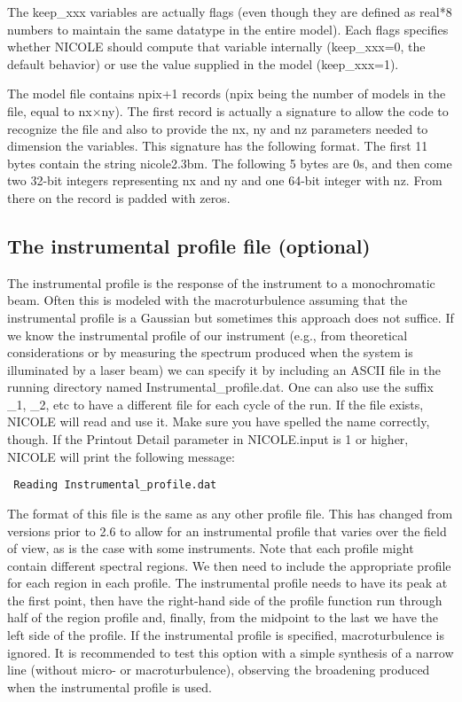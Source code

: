  The keep\_xxx variables are actually flags (even though they are
 defined as real*8 numbers to maintain the same datatype in the entire
 model). Each flags specifies whether NICOLE should compute that
 variable internally (keep\_xxx=0, the default behavior) or use the
 value supplied in the model (keep\_xxx=1).

The model file contains npix+1 records (npix being the number of models in
the file, equal to nx$\times$ny). The first record is actually a
signature to allow the code to recognize the file and also to provide
the nx, ny and nz parameters needed to dimension the variables. This
signature has the following format. The first 11 bytes contain the
string nicole2.3bm. The following 5 bytes are 0s, and then come two
32-bit integers representing nx and ny and one 64-bit integer with
nz. From there on the record is padded with zeros.

\subsection{The instrumental profile file (optional)}
\label{instprof}

The instrumental profile is the response of the instrument to a
monochromatic beam. Often this is modeled with the macroturbulence
assuming that the instrumental profile is a Gaussian but sometimes
this approach does not suffice. If we know the instrumental profile of
our instrument (e.g., from theoretical considerations or by measuring
the spectrum produced when the system is illuminated by a laser beam)
we can specify it by including an ASCII file in the running directory
named Instrumental\_profile.dat. One can also use the suffix \_1, \_2,
etc to have a different file for each cycle of the run. If the file
exists, NICOLE will read and use it. Make sure you have spelled the
name correctly, though. If the Printout Detail parameter in
NICOLE.input is 1 or higher, NICOLE will print the following message:
\begin{verbatim}
 Reading Instrumental_profile.dat
\end{verbatim}
The format of this file is the same as any other profile file. This
has changed from versions prior to 2.6 to allow for an instrumental
profile that varies over the field of view, as is the case with some
instruments. Note that each profile might contain different spectral
regions. We then need to include the appropriate profile for each
region in each profile. The instrumental profile needs to have its
peak at the first point, then have the right-hand side of the profile
function run through half of the region profile and, finally, from the
midpoint to the last we have the left side of the profile. If the
instrumental profile is specified, macroturbulence is ignored. It is
recommended to test this option with a simple synthesis of a narrow
line (without micro- or macroturbulence), observing the broadening
produced when the instrumental profile is used.


